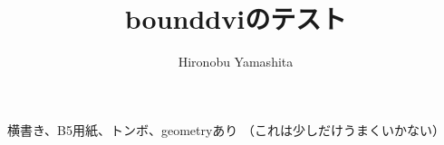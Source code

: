 \documentclass[b5paper,tombow]{jarticle}
\title{\textsf{bounddvi}のテスト}
\author{Hironobu Yamashita}
\begin{document}
横書き、B5用紙、トンボ、geometryあり
（これは少しだけうまくいかない）
\end{document}
